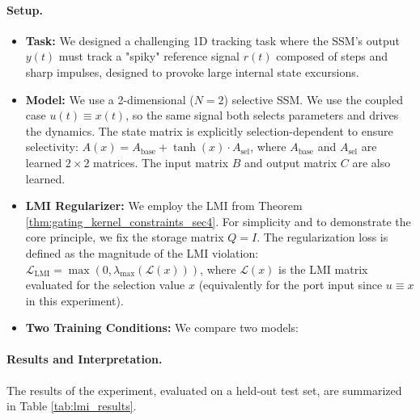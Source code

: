 \documentclass[10pt]{article} %
\theoremstyle{definition}
\begin{document}
\paragraph{Setup.}
\begin{itemize}
    \item \textbf{Task:} We designed a challenging 1D tracking task where the SSM's output $y(t)$ must track a "spiky" reference signal $r(t)$ composed of steps and sharp impulses, designed to provoke large internal state excursions.
    \item \textbf{Model:} We use a 2-dimensional ($N=2$) selective SSM. We use the coupled case $u(t)\equiv x(t)$, so the same signal both selects parameters and drives the dynamics. The state matrix is explicitly selection-dependent to ensure selectivity: $A(x) = A_{\text{base}} + \tanh(x) \cdot A_{\text{sel}}$, where $A_{\text{base}}$ and $A_{\text{sel}}$ are learned $2 \times 2$ matrices. The input matrix $B$ and output matrix $C$ are also learned.
    \item \textbf{LMI Regularizer:} We employ the LMI from Theorem \ref{thm:gating_kernel_constraints_sec4}. For simplicity and to demonstrate the core principle, we fix the storage matrix $Q=I$. The regularization loss is defined as the magnitude of the LMI violation: $\mathcal{L}_{\text{LMI}} = \max(0, \lambda_{\max}(\mathcal{L}(x)))$, where $\mathcal{L}(x)$ is the LMI matrix evaluated for the selection value $x$ (equivalently for the port input since $u\equiv x$ in this experiment).
    \item \textbf{Two Training Conditions:} We compare two models:
\end{itemize}

\paragraph{Results and Interpretation.}
The results of the experiment, evaluated on a held-out test set, are summarized in Table \ref{tab:lmi_results}.
\end{document}
